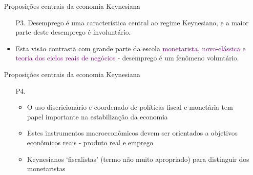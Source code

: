 \documentclass[10pt]{beamer}
\begin{document}
\begin{frame}{Proposições centrais da economia Keynesiana}
    \begin{enumerate}
        \item[P3.] Desemprego é uma característica central ao regime Keynesiano, e a maior parte deste desemprego é involuntário.
        \bigskip        
    \end{enumerate}
    \begin{itemize}
        \item Esta visão contrasta com grande parte da escola \textcolor{purple}{monetarista, novo-clássica e teoria dos ciclos reais de negócios} - desemprego é um fenômeno voluntário.
    \end{itemize}
\end{frame}

\begin{frame}{Proposições centrais da economia Keynesiana}
    \begin{enumerate}
        \item[P4.] 
        \bigskip
        \begin{itemize}
            \item O uso discricionário e coordenado de políticas fiscal e monetária tem papel importante na estabilização da economia
            \bigskip
            \item Estes instrumentos macroeconômicos devem ser orientados a objetivos econômicos reais - produto real e emprego
            \bigskip
            \item Keynesianos `fiscalistas' (termo não muito apropriado) para distinguir dos monetaristas
        \end{itemize}
    \end{enumerate}
\end{frame}
\end{document}
